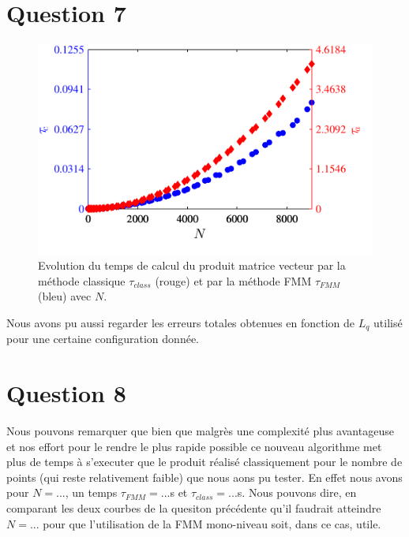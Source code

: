 \documentclass[10pt]{article}
\begin{document}
\begin{multicols}{2}
\section*{Question 7}


\begin{figure}[H]
  \begin{center}
  \includegraphics[width=0.95\columnwidth]{Q2a_4.pdf}
  \vspace*{-11pt}
  \caption{Evolution du temps de calcul du produit matrice vecteur par la méthode classique $\tau_{class}$ (rouge) et par la méthode FMM $\tau_{FMM}$ (bleu) avec $N$.}
  \label{fig:Q7a}
  \end{center}
\end{figure}
\vspace*{-22pt}

Nous avons pu aussi regarder les erreurs totales obtenues en fonction de $L_q$ utilisé pour une certaine configuration donnée. 


\vspace*{22pt}
\section*{Question 8}

Nous pouvons remarquer que bien que malgrès une complexité plus avantageuse et nos effort pour le rendre le plus rapide possible ce nouveau algorithme met plus de temps à s'executer que le produit réalisé classiquement pour le nombre de points (qui reste relativement faible) que nous aons pu tester. En effet nous avons pour $N = ...$, un temps $\tau_{FMM} = ... $s et $\tau_{class} = ... $s. Nous pouvons dire, en comparant les deux courbes de la quesiton précédente qu'il faudrait atteindre $N = ...$ pour que l'utilisation de la FMM mono-niveau soit, dans ce cas, utile. 



\end{multicols}
\end{document}
